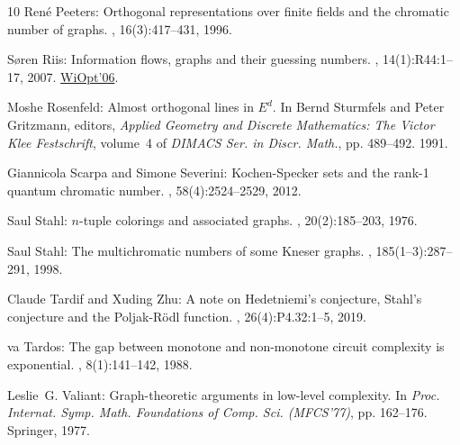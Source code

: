 \begin{thebibliography}{10}
{\sc Ren{\'e} Peeters}: Orthogonal representations over finite fields and the
  chromatic number of graphs.
, 16(3):417--431, 1996.
\newblock [\epfmtdoi{10.1007/BF01261326}]

{\sc S{\o}ren Riis}: Information flows, graphs and their guessing numbers.
, 14(1):R44:1--17, 2007.
\newblock \prelim \href{https:doi.org/10.1109/WIOPT.2006.1666516}{WiOpt'06}.
\newblock [\epfmtdoi{10.37236/962}]

{\sc Moshe Rosenfeld}: Almost orthogonal lines in ${E}^d$.
\newblock In {\sc Bernd Sturmfels and Peter Gritzmann}, editors, {\em Applied
  Geometry and Discrete Mathematics: The Victor Klee Festschrift}, volume~4 of
  {\em DIMACS Ser. in Discr. Math.}, pp. 489--492. 1991.

{\sc Giannicola Scarpa and Simone Severini}: {K}ochen-{S}pecker sets and the
  rank-1 quantum chromatic number.
, 58(4):2524--2529, 2012.

{\sc Saul Stahl}: $n$-tuple colorings and associated graphs.
, 20(2):185--203, 1976.
\newblock [\epfmtdoi{10.1016/0095-8956(76)90010-1}]

{\sc Saul Stahl}: The multichromatic numbers of some {K}neser graphs.
, 185(1--3):287--291, 1998.
\newblock [\epfmtdoi{10.1016/S0012-365X(97)00211-2}]

{\sc Claude Tardif and Xuding Zhu}: A note on {H}edetniemi's conjecture,
  {S}tahl's conjecture and the {P}oljak-{R}{\"o}dl function.
, 26(4):P4.32:1--5, 2019.
\newblock [\epfmtdoi{10.37236/8787}]

{va Tardos}: The gap between monotone and non-monotone circuit
  complexity is exponential.
, 8(1):141--142, 1988.
\newblock [\epfmtdoi{10.1007/BF02122563}]

{\sc Leslie~G. Valiant}: Graph-theoretic arguments in low-level complexity.
\newblock In {\em Proc. Internat. Symp. Math. Foundations of Comp. Sci.
  (MFCS'77)}, pp. 162--176. Springer, 1977.
\newblock [\epfmtdoi{10.1007/3-540-08353-7\_135}]


\end{thebibliography}
